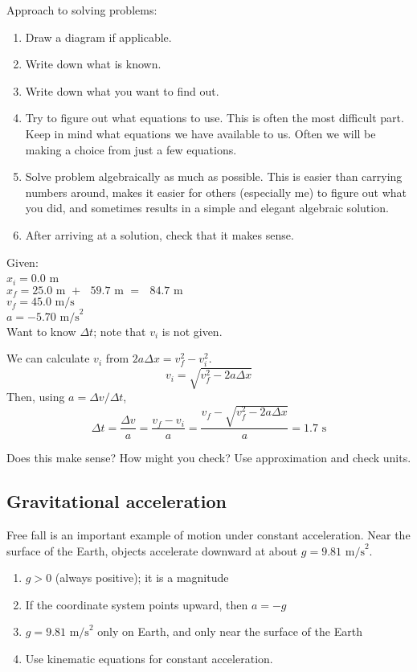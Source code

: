 Approach to solving problems:
\begin{enumerate}
\item Draw a diagram if applicable.
\item Write down what is known.
\item Write down what you want to find out.
\item Try to figure out what equations to use. This is often the most difficult part. Keep in mind what equations we have available to us. Often we will be making a choice from just a few equations. 
\item Solve problem algebraically as much as possible. This is easier than carrying numbers around, makes it easier for others (especially me) to figure out what you did, and sometimes results in a simple and elegant algebraic solution.
\item After arriving at a solution, check that it makes sense.
\end{enumerate}

Given:\\
$x_i=0.0$ m\\
$x_f=25.0\mbox{ m }+\mbox{ }59.7\mbox{ m }=\mbox{ }84.7\mbox{ m}$\\
$v_f=45.0\mbox{ m/s}$\\
$a=-5.70\mbox{ m/s}^2$\\

Want to know $\Delta{t}$; note that $v_i$ is not given.

We can calculate $v_i$ from $2a\Delta{x}=v_f^2-v_i^2$.
$$v_i=\sqrt{v_f^2-2a\Delta{x}}$$
Then, using $a=\Delta{v}/\Delta{t}$,
$$\Delta{t}=\frac{\Delta{v}}{a}=\frac{v_f-v_i}{a}=\frac{v_f-\sqrt{v_f^2-2a\Delta{x}}}{a}=1.7\mbox{ s}$$

Does this make sense? How might you check? Use approximation and check units.


\subsection{Gravitational acceleration}
Free fall is an important example of motion under constant acceleration. Near the surface of the Earth, objects accelerate downward at about $g=9.81\mbox{ m/s}^2$.

\begin{enumerate}
\item $g>0$ (always positive); it is a magnitude
\item If the coordinate system points upward, then $a=-g$
\item $g=9.81\mbox{ m/s}^2$ only on Earth, and only near the surface of the Earth
\item Use kinematic equations for constant acceleration.
\end{enumerate}

